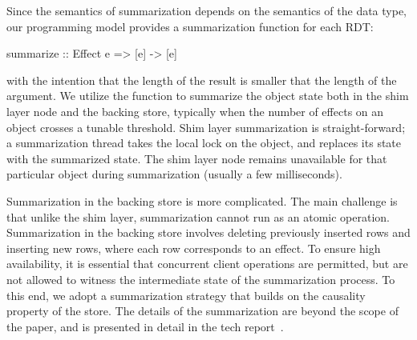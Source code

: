 \noindent Since the semantics of summarization depends on the semantics of the data
type, our programming model provides a summarization function for each RDT:
\begin{codehaskell}
summarize :: Effect e => [e] -> [e]
\end{codehaskell}
\noindent with the intention that the length of the result is smaller that the
length of the argument. We utilize the  function to summarize the
object state both in the shim layer node and the backing store, typically when
the number of effects on an object crosses a tunable threshold. Shim layer
summarization is straight-forward; a summarization thread takes the local lock
on the object, and replaces its state with the summarized state. The shim layer
node remains unavailable for that particular object during summarization
(usually a few milliseconds).

Summarization in the backing store is more complicated. The main challenge
is that unlike the shim layer, summarization cannot run as an atomic
operation. Summarization in the backing store involves deleting previously
inserted rows and inserting new rows, where each row corresponds to an
effect. To ensure high availability, it is essential that concurrent client
operations are permitted, but are not allowed to witness the intermediate
state of the summarization process. To this end, we adopt a summarization
strategy that builds on the causality property of the store. The details of
the summarization are beyond the scope of the paper, and is presented in
detail in the tech report~\cite{}.
